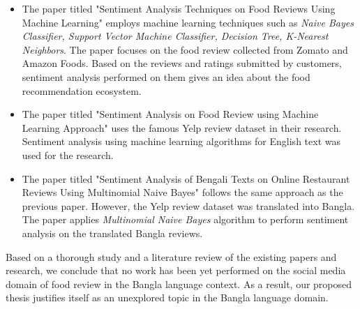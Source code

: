 \begin{itemize}
    \item {
        The paper titled "Sentiment Analysis Techniques on Food Reviews Using Machine Learning" \cite{paper_zomato_amazon} employs machine learning techniques such as \textit{Naive Bayes Classifier, Support Vector Machine Classifier, Decision Tree, K-Nearest Neighbors}. The paper focuses on the food review collected from Zomato and Amazon Foods. Based on the reviews and ratings submitted by customers, sentiment analysis performed on them gives an idea about the food recommendation ecosystem. 
    }

    \item {
        The paper titled "Sentiment Analysis on Food Review using Machine Learning Approach" \cite{paper_yelp} uses the famous Yelp review dataset in their research. Sentiment analysis using machine learning algorithms for English text was used for the research.
    }

    \item {
        The paper titled "Sentiment Analysis of Bengali Texts on Online Restaurant Reviews Using Multinomial Naive Bayes" \cite{paper_yelp_bn} follows the same approach as the previous paper. However, the Yelp review dataset was translated into Bangla. The paper applies \textit{Multinomial Naive Bayes} algorithm to perform sentiment analysis on the translated Bangla reviews.
    }
\end{itemize}

Based on a thorough study and a literature review of the existing papers and research, we conclude that no work has been yet performed on the social media domain of food review in the Bangla language context. As a result, our proposed thesis justifies itself as an unexplored topic in the Bangla language domain.
